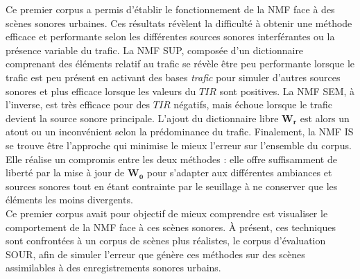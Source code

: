 Ce premier corpus a permis d'établir le fonctionnement de la NMF face à des scènes sonores urbaines. Ces résultats révèlent la difficulté à obtenir une méthode efficace et performante selon les différentes sources sonores interférantes ou la présence variable du trafic. 
La NMF SUP, composée d'un dictionnaire comprenant des éléments relatif au trafic se révèle être peu performante lorsque le trafic est peu présent en activant des bases \textit{trafic} pour simuler d'autres sources sonores et plus efficace lorsque les valeurs du $TIR$ sont positives. La NMF SEM, à l'inverse, est très efficace pour des $TIR$ négatifs, mais échoue lorsque le trafic devient la source sonore principale. L'ajout du dictionnaire libre $\mathbf{W_r}$ est alors un atout ou un inconvénient selon la prédominance du trafic. Finalement, la NMF IS se trouve être l'approche qui minimise le mieux l'erreur sur l'ensemble du corpus. Elle réalise un compromis entre les deux méthodes : elle offre suffisamment de liberté par la mise à jour de $\mathbf{W_0}$ pour s'adapter aux différentes ambiances et sources sonores tout en étant contrainte par le seuillage à ne conserver que les éléments les moins divergents.\\

Ce premier corpus avait pour objectif de mieux comprendre est visualiser le comportement de la NMF face à ces scènes sonores. À présent, ces techniques sont confrontées à un corpus de scènes plus réalistes, le corpus d'évaluation SOUR, afin de simuler l'erreur que génère ces méthodes sur des scènes assimilables à des enregistrements sonores urbains.




%
